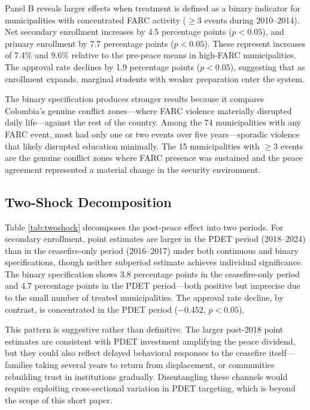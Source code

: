 \documentclass[12pt]{article}
\begin{document}
Panel B reveals larger effects when treatment is defined as a binary indicator for municipalities with concentrated FARC activity ($\geq$3 events during 2010--2014). Net secondary enrollment increases by 4.5 percentage points ($p<0.05$), and primary enrollment by 7.7 percentage points ($p<0.05$). These represent increases of 7.4\% and 9.6\% relative to the pre-peace means in high-FARC municipalities. The approval rate declines by 1.9 percentage points ($p<0.05$), suggesting that as enrollment expands, marginal students with weaker preparation enter the system.

The binary specification produces stronger results because it compares Colombia's genuine conflict zones---where FARC violence materially disrupted daily life---against the rest of the country. Among the 74 municipalities with any FARC event, most had only one or two events over five years---sporadic violence that likely disrupted education minimally. The 15 municipalities with $\geq$3 events are the genuine conflict zones where FARC presence was sustained and the peace agreement represented a material change in the security environment.

\subsection{Two-Shock Decomposition}



Table \ref{tab:twoshock} decomposes the post-peace effect into two periods. For secondary enrollment, point estimates are larger in the PDET period (2018--2024) than in the ceasefire-only period (2016--2017) under both continuous and binary specifications, though neither subperiod estimate achieves individual significance. The binary specification shows 3.8 percentage points in the ceasefire-only period and 4.7 percentage points in the PDET period---both positive but imprecise due to the small number of treated municipalities. The approval rate decline, by contrast, is concentrated in the PDET period ($-0.452$, $p<0.05$).

This pattern is suggestive rather than definitive. The larger post-2018 point estimates are consistent with PDET investment amplifying the peace dividend, but they could also reflect delayed behavioral responses to the ceasefire itself---families taking several years to return from displacement, or communities rebuilding trust in institutions gradually. Disentangling these channels would require exploiting cross-sectional variation in PDET targeting, which is beyond the scope of this short paper.
\end{document}
